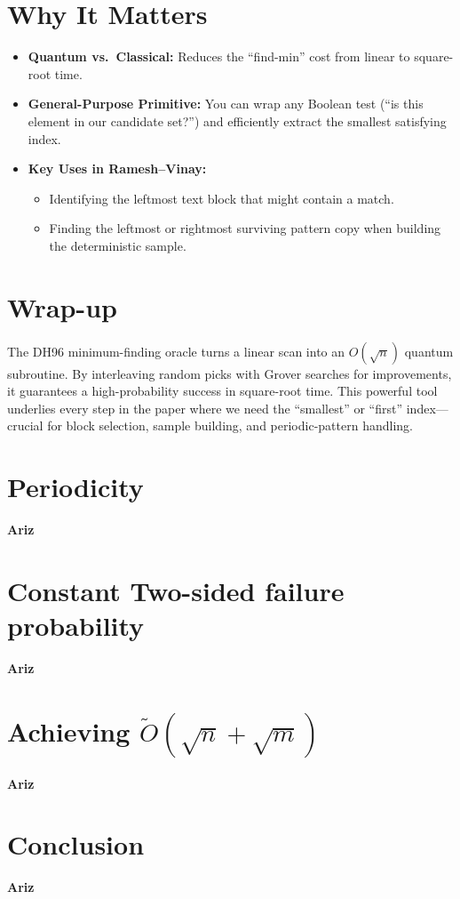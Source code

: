 \documentclass[11pt]{article}
\begin{document}
\section*{Why It Matters}
\begin{itemize}
  \item \textbf{Quantum vs.\ Classical:} Reduces the “find-min” cost from linear to square-root time.
  \item \textbf{General-Purpose Primitive:} You can wrap any Boolean test (“is this element in our candidate set?”) and efficiently extract the smallest satisfying index.
  \item \textbf{Key Uses in Ramesh--Vinay:}
        \begin{itemize}
          \item Identifying the leftmost text block that might contain a match.
          \item Finding the leftmost or rightmost surviving pattern copy when building the deterministic sample.
        \end{itemize}
\end{itemize}



\section*{Wrap-up}
The DH96 minimum-finding oracle turns a linear scan into an \(O(\sqrt{n})\) quantum subroutine. By interleaving random picks with Grover searches for improvements, it guarantees a high-probability success in square-root time. This powerful tool underlies every step in the paper where we need the “smallest” or “first” index—crucial for block selection, sample building, and periodic-pattern handling.

\section*{Periodicity}
\textbf{Ariz} \linebreak
\section*{Constant Two-sided failure probability}
\textbf{Ariz} \linebreak
\section*{Achieving \(\tilde{O}(\sqrt{n} + \sqrt{m})\)}
\textbf{Ariz} \linebreak
\section*{Conclusion}
\textbf{Ariz} \linebreak
\end{document}
